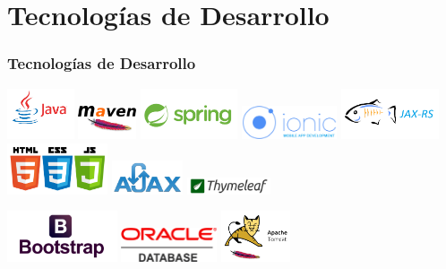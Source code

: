 \documentclass[usenames,dvipsnames]{beamer}
\begin{document}
\section{Tecnologías de Desarrollo}
\begin{frame}
\frametitle{Tecnologías de Desarrollo}
\begin{center}
\includegraphics[height=1.5cm, angle=10]{./img/java.png}
\includegraphics[height=1cm]{./img/maven.png}
\includegraphics[height=1.5cm, angle=8]{./img/spring.png}
\includegraphics[height=1cm, angle=-5]{./img/ionic.png}
\includegraphics[height=1.5cm, angle=-5]{./img/jaxrs.png}
\includegraphics[height=1.5cm, angle=-5]{./img/htmlcssjs.png}
\includegraphics[height=1cm, angle=5]{./img/ajax.png}
\includegraphics[height=0.5cm, angle=5]{./img/thymeleaf.png}

\includegraphics[height=1.5cm, angle=12]{./img/bootstrap.png}
\includegraphics[height=1cm]{./img/oracledb.png}
\includegraphics[height=1.5cm, angle=-5]{./img/tomcat.png}

\end{center}
\end{frame}
\end{document}
